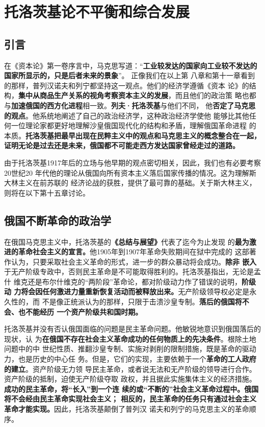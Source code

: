\chapter{托洛茨基论不平衡和综合发展}

\section{引言}

在《资本论》第一卷序言中，马克思写道：“\textbf{工业较发达的国家向工业较不发达的
  国家所显示的，只是后者未来的景象}”。 正像我们在以上第
八章和第十一章看到的那样，普列汉诺夫和列宁都坚持这一观点。他们的经济学遵循《资本
论》的结构，\textbf{集中从商品生产关系的视角考察资本主义的发展}，而且他们的政治策
略也都与\textbf{加速俄国的西方化进程}相一致。\textbf{列夫·托洛茨基}与他们不同，
他\textbf{否定了马克思的观点}。他系统地阐述了自己的政治经济学，这种政治经济学使他
能够比其他任何一位理论家都更好地理解沙皇俄国现代化的结构和矛盾，理解俄国革命进程
的本质。\textbf{托洛茨基把最早出现在民粹主义中的观点和马克思主义的概念整合在一起，
  证明无论是过去还是未来，俄国都不可能走西方发达国家曾经走过的道路。}

由于托洛茨基1917年后的立场与他早期的观点密切相关，因此，我们也有必要考察20世纪20
年代他的理论从俄国向所有资本主义落后国家传播的情况。这为理解斯大林主义在前苏联的
经济论战的获胜，提供了最可靠的基础。关于斯大林主义，则将在以下第十五章讨论。

\section{俄国不断革命的政治学}

在俄国马克思主义中，托洛茨基的\textbf{《总结与展望》}代表了迄今为止发现
的\textbf{最为激进的革命社会主义的宣言。}他1905年到1907年革命失败期间在狱中完成的
这部著作认为，只要采取社会主义革命的形式，进一步的群众暴动将会成功。\textbf{除非
  嵌入}于无产阶级专政中，否则民主革命是不可能取得胜利的。托洛茨基指出，无论是孟什
维克还是布尔什维克的“两阶段”革命论，都对阶级动力作了错误的说明，\textbf{阶级动
  力将会因任何激进力量重新恢复活动而被释放出来。}无产阶级领导权必定是永久性的，而
不是像正统派认为的那样，只限于击溃沙皇专制。\textbf{落后的俄国将不会、也不能经历
  一个资产阶级共和国时期。}

托洛茨基并没有否认俄国面临的问题是民主革命问题。他敏锐地意识到俄国落后的现状，认
为\textbf{在俄国不存在社会主义革命成功的任何物质上的先决条件}。根除土地问题中的中
世纪性质、推翻沙皇专制、实施对剥削的限制措施，既是革命的驱动力，也是历史的中心任
务。但是，它们的实现，主要依赖于一个\textbf{革命的工人政府的建立}。资产阶级无力领
导民主革命，或者说无法和无产阶级的领导进行合作。资产阶级的抵制，迫使无产阶级夺取
政权，并且据此实施集体主义的经济措施。\textbf{成功的民主革命，将“长入”到一个连
  续的或“不断的”社会主义革命过程中。}\textbf{俄国将不会经由民主革命实现社会主义；
  相反的，民主革命的任务只有通过社会主义革命才能实现。}因此，托洛茨基颠倒了普列汉
诺夫和列宁的马克思主义的革命顺序。

